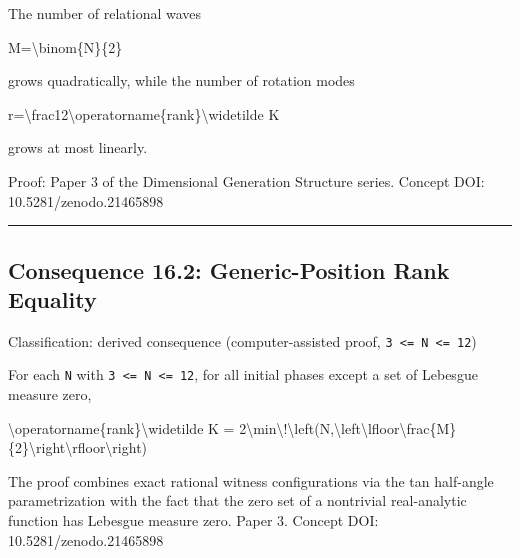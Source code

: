 \documentclass[
  a4paper,
]{article}
\newenvironment{Shaded}{}{}
\newcommand{\NormalTok}[1]{#1}
\begin{document}
The number of relational waves

\begin{Shaded}
\begin{Highlighting}[]
\NormalTok{M=\textbackslash{}binom\{N\}\{2\}}
\end{Highlighting}
\end{Shaded}

grows quadratically, while the number of rotation modes

\begin{Shaded}
\begin{Highlighting}[]
\NormalTok{r=\textbackslash{}frac12\textbackslash{}operatorname\{rank\}\textbackslash{}widetilde K}
\end{Highlighting}
\end{Shaded}

grows at most linearly.

Proof: Paper 3 of the Dimensional Generation Structure series. Concept
DOI: 10.5281/zenodo.21465898

\begin{center}\rule{0.5\linewidth}{0.5pt}\end{center}

\subsection{Consequence 16.2: Generic-Position Rank
Equality}\label{consequence-16.2-generic-position-rank-equality}

Classification: derived consequence (computer-assisted proof,
\texttt{3\ \textless{}=\ N\ \textless{}=\ 12})

For each \texttt{N} with \texttt{3\ \textless{}=\ N\ \textless{}=\ 12},
for all initial phases except a set of Lebesgue measure zero,

\begin{Shaded}
\begin{Highlighting}[]
\NormalTok{\textbackslash{}operatorname\{rank\}\textbackslash{}widetilde K}
\NormalTok{=}
\NormalTok{2\textbackslash{}min\textbackslash{}!\textbackslash{}left(N,\textbackslash{}left\textbackslash{}lfloor\textbackslash{}frac\{M\}\{2\}\textbackslash{}right\textbackslash{}rfloor\textbackslash{}right)}
\end{Highlighting}
\end{Shaded}

The proof combines exact rational witness configurations via the tan
half-angle parametrization with the fact that the zero set of a
nontrivial real-analytic function has Lebesgue measure zero. Paper 3.
Concept DOI: 10.5281/zenodo.21465898
\end{document}
